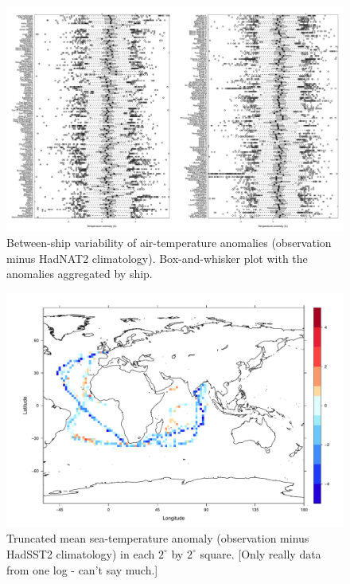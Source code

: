 \documentclass[a4paper,11pt]{article}
\begin{document}
\begin{figure}
\begin{center}
\includegraphics[angle=90, width=1.0\textwidth]{../anomaly_ts/at_anom_bwplot_byShip}
\caption{Between-ship variability of air-temperature anomalies (observation minus HadNAT2 climatology). Box-and-whisker plot with the anomalies aggregated by ship.}
\label{at_anom_bwplot_byShip}
\end{center}
\end{figure}

\clearpage

\begin{figure}
\begin{center}
\includegraphics[angle=0, width=1.0\textwidth]{../anomaly_map/sst_anomaly}
\caption{Truncated mean sea-temperature anomaly (observation minus HadSST2 climatology) in each $2^\circ$ by $2^\circ$ square. [Only really data from one log - can't say much.]}
\label{sst_anomaly}
\end{center}
\end{figure}
\end{document}
